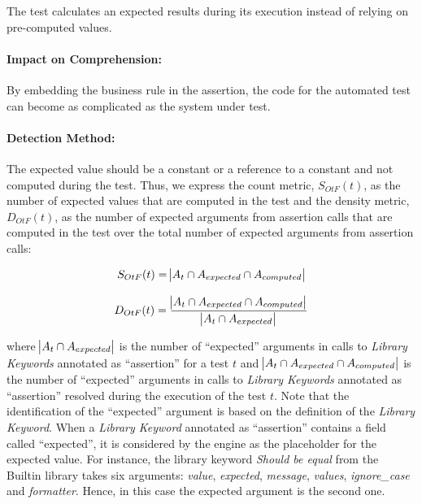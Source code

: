 The test calculates an expected results during its execution instead of relying on pre-computed values.

\paragraph{Impact on Comprehension:} 

By embedding the business rule in the assertion, the code for the automated test can become as complicated as the system under test.

\paragraph{Detection Method:}

The expected value should be a constant or a reference to a constant and not computed during the test. Thus, we express the count metric, $S_{OtF}(t)$, as the number of expected values that are computed in the test and the density metric, $D_{OtF}(t)$, as the number of expected arguments from assertion calls that are computed in the test over the total number of expected arguments from assertion calls:

\begin{equation*}
    S_{OtF}(t) = \abs{A_{t} \cap A_{expected} \cap A_{computed}}
\end{equation*}

\begin{equation*}
    D_{OtF}(t) = \frac{\abs{A_{t} \cap A_{expected} \cap A_{computed}}}{\abs{A_{t} \cap A_{expected}}}
\end{equation*}

where $\abs{A_{t} \cap A_{expected}}$ is the number of ``expected'' arguments in calls to \emph{Library Keywords} annotated as ``assertion'' for a test $t$ and  $\abs{A_{t} \cap A_{expected} \cap A_{computed}}$ is the number of ``expected'' arguments in calls to \emph{Library Keywords} annotated as ``assertion'' resolved during the execution of the test $t$. Note that the identification of the ``expected'' argument is based on the definition of the \emph{Library Keyword}. When a \emph{Library Keyword} annotated as ``assertion'' contains a field called ``expected'', it is considered by the engine as the placeholder for the expected value. For instance, the library keyword \emph{Should be equal} from the Builtin library takes six arguments: \emph{value}, \emph{expected}, \emph{message}, \emph{values}, \emph{ignore\_case} and \emph{formatter}. Hence, in this case the expected argument is the second one.

